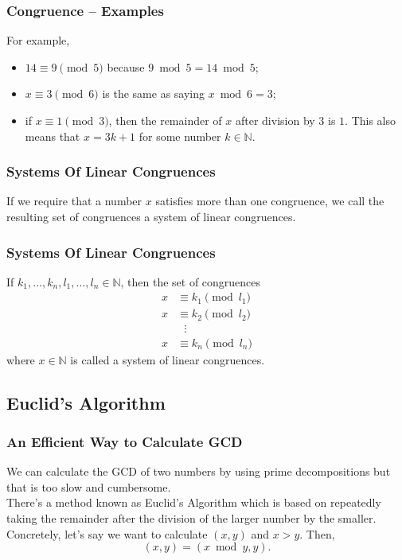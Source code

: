 \documentclass[aspectratio=169,11pt,usenames,dvipsnames]{beamer}
\newcommand{\N}{\mathbb{N}}
\begin{document}
\begin{frame}
 \frametitle{Congruence -- Examples}
 For example,
 \begin{itemize}
  \item $14 \equiv 9 \pmod{5}$ because $9 \bmod 5 = 14 \bmod 5$;
  \pause
  \item $x \equiv 3 \pmod{6}$ is the same as saying $x \bmod 6 = 3$;
  \pause
  \item if $x \equiv 1 \pmod{3}$, then the remainder of $x$ after division by
   $3$ is $1$. This also means that $x = 3k + 1$ for some number $k \in \N$.
 \end{itemize}
\end{frame}

\begin{frame}
 \frametitle{Systems Of Linear Congruences}
 If we require that a number $x$ satisfies more than one congruence, we call the
 resulting set of congruences a \alert{system of linear congruences}.\\
\end{frame}

\begin{frame}
 \frametitle{Systems Of Linear Congruences}
 \begin{tcolorbox}[title=System Of Linear Congruences]
  If $k_1,\ldots,k_n,l_1,\ldots,l_n \in \N$, then the set of congruences
  \begin{equation*}
   \begin{split}
    x & \equiv k_1 \pmod{l_1}\\
    x & \equiv k_2 \pmod{l_2}\\
      &~~~\vdots\\
    x & \equiv k_n \pmod{l_n}
   \end{split}
  \end{equation*}
  where $x \in \N$ is called a \alert{system of linear congruences}.
 \end{tcolorbox}
\end{frame}

\subsection{Euclid's Algorithm}

\begin{frame}
 \subsectionpage
\end{frame}

\begin{frame}
 \frametitle{An Eff\hspace*{0pt}icient Way to Calculate GCD}
 We can calculate the GCD of two numbers by using prime decompositions but that
 is too slow and cumbersome.\\
 \pause
 There's a method known as \alert{Euclid's Algorithm} which is based on
 repeatedly taking the remainder after the division of the larger number by the
 smaller.\\
 \pause
 Concretely, let's say we want to calculate $(x,y)$ and $x > y$. Then,
 \[
  (x,y) = (x \bmod y, y).
 \]
\end{frame}
\end{document}
